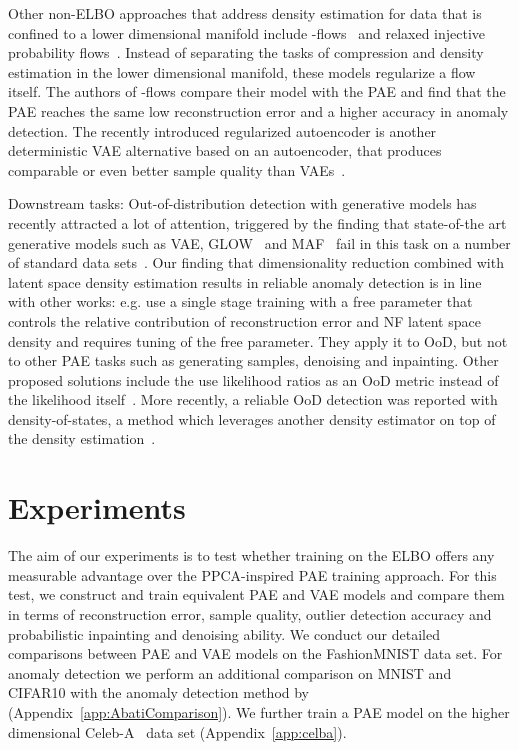 \documentclass[10pt]{article} \usepackage[accepted]{tmlr}
\newcommand{\rev}[1]{{\color{black}#1}}
\begin{document}
Other non-ELBO approaches that address density estimation for data that is confined to a lower dimensional manifold include -flows~\citep{Brehmer2020} and relaxed injective probability flows~\citep{Kumar2020}. Instead of separating the tasks of compression and density estimation in the lower dimensional manifold, these models regularize a flow itself. The authors of -flows compare their model with the PAE and find that the PAE reaches the same low reconstruction error and a higher accuracy in anomaly detection. The recently introduced regularized autoencoder is another deterministic VAE alternative based on an autoencoder, that produces comparable or even better sample quality than VAEs~\citep{Gosh2020}.

Downstream tasks: Out-of-distribution detection with generative models has recently attracted a lot of attention, triggered by the finding that state-of-the art generative models such as VAE, GLOW~\citep{glow} and MAF~\citep{MAF} fail in this task on a number of standard data sets~\citep{Nalisnick2019}. \rev{Our finding that dimensionality reduction combined with latent space density estimation results in reliable anomaly detection is in line with other works: e.g. \cite{AbatiPCC19} use a single stage training with a free parameter that 
controls the relative contribution of 
reconstruction error and NF latent space density and requires tuning of the free 
parameter. They apply it to OoD, but not 
to other PAE tasks such as generating samples, denoising and inpainting.} Other proposed solutions include the use likelihood ratios as an OoD metric instead of the likelihood itself~\citep{Gosh2020}. More recently, a reliable OoD detection was reported with density-of-states, a method which leverages another density estimator on top of the density estimation~\citep{DensityofStates}. 
\section{Experiments}
The aim of our experiments is to test whether training on the ELBO offers any measurable advantage over the PPCA-inspired PAE training approach. For this test, we construct and train equivalent PAE and VAE models and compare them in terms of reconstruction error, sample quality, outlier detection accuracy and probabilistic inpainting and denoising ability. We conduct our detailed comparisons between PAE and VAE models on the FashionMNIST data set. For anomaly detection we perform an additional comparison on MNIST and CIFAR10 with the anomaly detection method by~\citet{AbatiPCC19} (Appendix~\ref{app:AbatiComparison}). We further train a PAE model on the higher dimensional Celeb-A~\citep{celeba} data set (Appendix~\ref{app:celba}).
\end{document}
